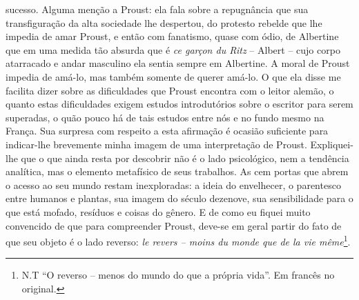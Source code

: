 sucesso. Alguma menção a Proust: ela fala sobre a repugnância que sua
transfiguração da alta sociedade lhe despertou, do protesto rebelde que
lhe impedia de amar Proust, e então com fanatismo, quase com ódio, de
Albertine que em uma medida tão absurda que é \emph{ce garçon du Ritz}
-- Albert -- cujo corpo atarracado e andar masculino ela sentia sempre
em Albertine. A moral de Proust impedia de amá-lo, mas também somente de
querer amá-lo. O que ela disse me facilita dizer sobre as dificuldades
que Proust encontra com o leitor alemão, o quanto estas dificuldades
exigem estudos introdutórios sobre o escritor para serem superadas, o
quão pouco há de tais estudos entre nós e no fundo mesmo na França. Sua
surpresa com respeito a esta afirmação é ocasião suficiente para
indicar-lhe brevemente minha imagem de uma interpretação de Proust.
Expliquei-lhe que o que ainda resta por descobrir não é o lado
psicológico, nem a tendência analítica, mas o elemento metafísico de
seus trabalhos. As cem portas que abrem o acesso ao seu mundo restam
inexploradas: a ideia do envelhecer, o parentesco entre humanos e
plantas, sua imagem do século dezenove, sua sensibilidade para o que
está mofado, resíduos e coisas do gênero. E de como eu fiquei muito
convencido de que para compreender Proust, deve-se em geral partir do
fato de que seu objeto é o lado reverso: \emph{le revers -- moins du
monde que de la vie même}\footnote{N.T ``O reverso -- menos do mundo do
  que a própria vida''. Em francês no original.}.

